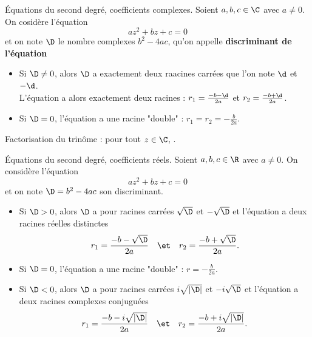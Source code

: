 \documentclass[11pt]{article}
\begin{document}
\begin{prop}{Équations du second degré, coefficients complexes.}{}
    Soient $a,b,c\in\C$ avec $a\neq 0$. On cosidère l'équation
    \begin{equation*}
        az^2+bz+c=0
    \end{equation*}
    et on note $\D$ le nombre complexes $b^2-4ac$, qu'on appelle \bf{discriminant} de l'équation
    \begin{itemize}
        \item Si $\D\neq0$, alors $\D$ a exactement deux raacines carrées que l'on note $\d$ et $-\d$.\\
        L'équation a alors exactement deux racines : $r_1=\frac{-b-\d}{2a}$ et $r_2=\frac{-b+\d}{2a}$.
        \item Si $\D=0$, l'équation a une racine "double" : $r_1=r_2=-\frac{b}{2a}$.
    \end{itemize}
    Factorisation du trinôme : pour tout $z\in\C$, .
\end{prop}

\begin{prop}{Équations du second degré, coefficients réels.}{}
    Soient $a,b,c\in\R$ avec $a\neq0$. On considère l'équation
    \begin{equation*}
        az^2+bz+c=0
    \end{equation*}
    et on note $\D=b^2-4ac$ son discriminant.
    \begin{itemize}
        \item Si $\D>0$, alors $\D$ a pour racines carrées $\sqrt{\D}$ et $-\sqrt{\D}$ et l'équation a deux racines réelles distinctes
        \begin{equation*}
            r_1=\frac{-b-\sqrt{\D}}{2a}\quad\et\quad r_2=\frac{-b+\sqrt{\D}}{2a}.
        \end{equation*}
        \item Si $\D=0$, l'équation a une racine "double" : $r=-\frac{b}{2a}$.
        \item Si $\D<0$, alors $\D$ a pour racines carrées $i\sqrt{|\D|}$ et $-i\sqrt{\D}$ et l'équation a deux racines complexes conjuguées
        \begin{equation*}
            r_1=\frac{-b-i\sqrt{|\D|}}{2a}\quad\et\quad r_2=\frac{-b+i\sqrt{|\D|}}{2a}.
        \end{equation*}
    \end{itemize}
\end{prop}
\end{document}
